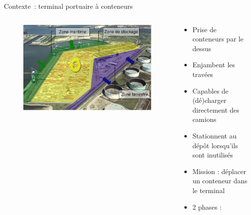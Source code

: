 \documentclass[table]{beamer}
\newcommand{\soustitre}[1]{\vspace{5pt}{\small\textbf{\textcolor{bleuL}{#1}}}} %
\begin{document}
\begin{frame}{}
  \vfill	
  \begin{columns}
    \begin{column}{.945\paperwidth}
      \begin{block}{Contexte~: terminal portuaire à conteneurs}
        \begin{columns}[c]
	  \begin{column}{.45\linewidth}
	    \soustitre{Transfert de conteneurs entre 3 zones~: }
          \end{column}
          \begin{column}{.50\linewidth}
            \soustitre{Chariots Cavaliers~:}
          \end{column}
          \end{columns}
          \vspace{-20pt}
	\begin{columns}[t]
	  \begin{column}{.45\linewidth}
	    \begin{figure}[h]
		\includegraphics[width =0.6\linewidth]{3zonesDuTN}
	      \end{figure}
	   \end{column}
	   \begin{column}{.50\linewidth}
	      \begin{columns}[t]
	      \begin{column}{0.62\linewidth}
		\begin{itemize}
		  \item Prise de conteneurs par le dessus
		  \item Enjambent les travées
		  \item Capables de (dé)charger directement des camions
		  \item Stationnent au dépôt lorsqu'ils sont inutilisés
		  \item Mission : déplacer un conteneur dans le terminal
		  \item 2 phases : 

\end{itemize}
\end{column}
\end{columns}
\end{column}
\end{columns}
\end{block}
\end{column}
\end{columns}
\end{frame}
\end{document}
